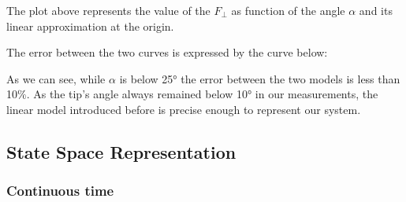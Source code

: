                 

                The plot above represents the value of the $F_\perp$ as function of the angle $\alpha$ and its linear approximation at the origin.

                The error between the two curves is expressed by the curve below:

                As we can see, while $\alpha$ is below 25° the error between the two models is less than 10$\%$. As the tip's angle always remained below 10° in our measurements, the linear model introduced before is precise enough to represent our system.

        \subsection{State Space Representation}

            \subsubsection{Continuous time}

